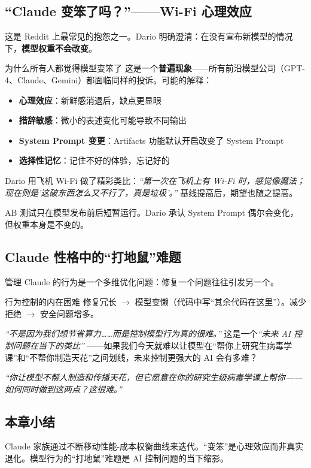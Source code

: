 \subsection{``Claude 变笨了吗？''——Wi-Fi 心理效应}

这是 Reddit 上最常见的抱怨之一。Dario 明确澄清：在没有宣布新模型的情况下，\textbf{模型权重不会改变}。

\begin{warningbox}{为什么所有人都觉得模型变笨了}
这是一个\textbf{普遍现象}——所有前沿模型公司（GPT-4、Claude、Gemini）都面临同样的投诉。可能的解释：

\begin{itemize}
    \item \textbf{心理效应}：新鲜感消退后，缺点更显眼
    \item \textbf{措辞敏感}：微小的表述变化可能导致不同输出
    \item \textbf{System Prompt 变更}：Artifacts 功能默认开启改变了 System Prompt
    \item \textbf{选择性记忆}：记住不好的体验，忘记好的
\end{itemize}

Dario 用飞机 Wi-Fi 做了精彩类比：\textit{``第一次在飞机上有 Wi-Fi 时，感觉像魔法；现在则是'这破东西怎么又不行了，真是垃圾'。''} 基线提高后，期望也随之提高。

AB 测试只在模型发布前后短暂运行。Dario 承认 System Prompt 偶尔会变化，但权重本身是不变的。
\end{warningbox}

\subsection{Claude 性格中的``打地鼠''难题}

管理 Claude 的行为是一个多维优化问题：修复一个问题往往引发另一个。

\begin{knowledgebox}{行为控制的内在困难}
修复冗长 $\to$ 模型变懒（代码中写``其余代码在这里''）。减少拒绝 $\to$ 安全问题增多。

\textit{``不是因为我们想节省算力……而是控制模型行为真的很难。''} 这是一个\textit{``未来 AI 控制问题在当下的类比''} ——如果我们今天就难以让模型在``帮你上研究生病毒学课''和``不帮你制造天花''之间划线，未来控制更强大的 AI 会有多难？

\textit{``你让模型不帮人制造和传播天花，但它愿意在你的研究生级病毒学课上帮你——如何同时做到这两点？这很难。''}
\end{knowledgebox}

\subsection{本章小结}

Claude 家族通过不断移动性能-成本权衡曲线来迭代。``变笨''是心理效应而非真实退化。模型行为的``打地鼠''难题是 AI 控制问题的当下缩影。

